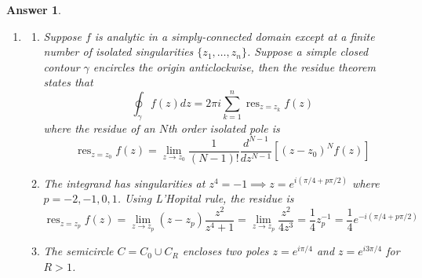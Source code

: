 \documentclass[a4paper]{article}
\DeclareMathOperator{\res}{res}
\newtheorem{ans}{Answer}[section]
\theoremstyle{new}
\begin{document}
\begin{ans}\leavevmode
\begin{enumerate}[label=(\alph*)]
\item
\begin{enumerate}[label=(\roman*)]
\item 
Suppose $f$ is analytic in a simply-connected domain except at a finite number of isolated singularities $\{z_1,\dots,z_n\}$. Suppose a simple closed contour $\gamma$ encircles the origin anticlockwise, then the residue theorem states that
$$\oint_\gamma f(z)dz=2\pi i\sum_{k=1}^n\res_{z=z_k}f(z)$$
where the residue of an $N$th order isolated pole is
$$\res_{z=z_0}f(z)=\lim_{z\rightarrow z_0}\frac{1}{(N-1)!}\frac{d^{N-1}}{dz^{N-1}}[(z-z_0)^Nf(z)]$$
\item The integrand has singularities at $z^4=-1\implies z=e^{i(\pi/4+p\pi/2)}$ where $p=-2,-1,0,1$. Using L'Hopital rule, the residue is
$$\res_{z=z_p}f(z)=\lim_{z\rightarrow z_p}(z-z_p)\frac{z^2}{z^4+1}=\lim_{z\rightarrow z_p}\frac{z^2}{4z^3}=\frac{1}{4}z_p^{-1}=\frac{1}{4}e^{-i(\pi/4+p\pi/2)}$$
\item The semicircle $C=C_0\cup C_R$ encloses two poles $z=e^{i\pi/4}$ and $z=e^{i3\pi/4}$ for $R>1$.
\begin{center}
\end{center}
\end{enumerate}
\end{enumerate}
\end{ans}
\end{document}
